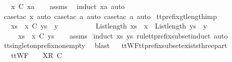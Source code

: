 \ \ \ {\isachardoublequoteopen}{\isacharbrackleft}x{\isacharbrackright}\ {\isasymlesssim}\isactrlsub C\ xa{\isachardoublequoteclose}\isanewline
%
\isadelimproof
\ \ %
\endisadelimproof
%
\isatagproof
{}\isamarkupfalse%
\ assms\ \isamarkupfalse%
\ {\isacharparenleft}induct\ xa{\isacharcomma}\ auto{\isacharparenright}\isanewline
\ \ \isamarkupfalse%
\ {\isacharparenleft}case{\isacharunderscore}tac\ x{\isacharcomma}\ auto{\isacharcomma}\ case{\isacharunderscore}tac\ a{\isacharcomma}\ auto{\isacharcomma}\ case{\isacharunderscore}tac\ a{\isacharcomma}\ auto{\isacharparenright}%
\endisatagproof
{\isafoldproof}%
%
\isadelimproof
\isanewline
%
\endisadelimproof
\isanewline
{}\isamarkupfalse%
\ tt{\isacharunderscore}prefix{\isacharunderscore}gt{\isacharunderscore}length{\isacharunderscore}imp{\isacharcolon}\isanewline
\ \ \ {\isachardoublequoteopen}xs\ {\isacharat}\ {\isacharbrackleft}x{\isacharbrackright}\ {\isasymlesssim}\isactrlsub C\ ys\ {\isacharat}\ {\isacharbrackleft}y{\isacharbrackright}{\isachardoublequoteclose}\isanewline
\ \ \ \ \ \ \ \ \ \ {\isachardoublequoteopen}List{\isachardot}length\ {\isacharparenleft}xs\ {\isacharat}\ {\isacharbrackleft}x{\isacharbrackright}{\isacharparenright}\ {\isacharless}\ List{\isachardot}length\ {\isacharparenleft}ys\ {\isacharat}\ {\isacharbrackleft}y{\isacharbrackright}{\isacharparenright}{\isachardoublequoteclose}\isanewline
\ \ \ \ \ {\isachardoublequoteopen}xs\ {\isacharat}\ {\isacharbrackleft}x{\isacharbrackright}\ {\isasymlesssim}\isactrlsub C\ ys{\isachardoublequoteclose}\isanewline
%
\isadelimproof
\ \ %
\endisadelimproof
%
\isatagproof
{}\isamarkupfalse%
\ assms\ \isamarkupfalse%
{\isacharparenleft}induct\ xs\ ys\ rule{\isacharcolon}tt{\isacharunderscore}prefix{\isacharunderscore}subset{\isachardot}induct{\isacharcomma}\ auto{\isacharparenright}\isanewline
\ \ \isamarkupfalse%
\ tt{\isacharunderscore}singleton{\isacharunderscore}prefix{\isacharunderscore}nonempty\ \isamarkupfalse%
\ blast%
\endisatagproof
{\isafoldproof}%
%
\isadelimproof
\ \isanewline
%
\endisadelimproof
\isanewline
{}\isamarkupfalse%
\ ttWF{\isacharunderscore}tt{\isacharunderscore}prefix{\isacharunderscore}subset{\isacharunderscore}exists{\isacharunderscore}three{\isacharunderscore}part{\isacharcolon}\isanewline
\ \ \ {\isachardoublequoteopen}ttWF\ {\isasymsigma}{\isachardoublequoteclose}\ {\isachardoublequoteopen}{\isasymrho}\ {\isacharat}\ {\isacharbrackleft}{\isacharbrackleft}X{\isacharbrackright}\isactrlsub R{\isacharbrackright}\ {\isasymlesssim}\isactrlsub C\ {\isasymsigma}{\isachardoublequoteclose}\isanewline
